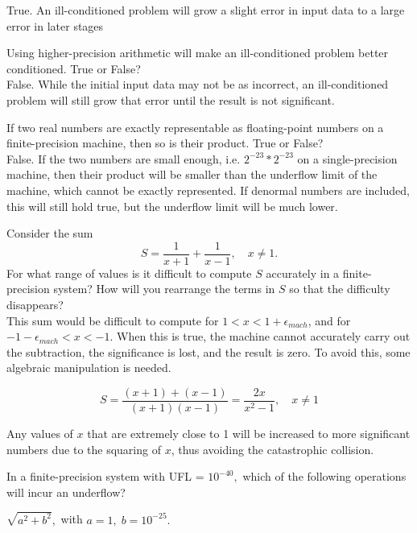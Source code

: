 	True. An ill-conditioned problem will grow a slight error in input data to a large error in later stages \\

\item Using higher-precision arithmetic will make an ill-conditioned problem better conditioned.  True or False? \\

	False. While the initial input data may not be as incorrect, an ill-conditioned problem will still grow that error until the result
	is not significant. \\

\item  If two real numbers are exactly representable as floating-point numbers on a finite-precision machine, then so is their product.  True or False? \\

	False. If the two numbers are small enough, i.e. $2^{-23} * 2^{-23}$ on a single-precision machine, then their product will be
	smaller than the underflow limit of the machine, which cannot be exactly represented. If denormal numbers are included, this will
	still hold true, but the underflow limit will be much lower.
\item  Consider the sum
\[
S = \frac{1}{x+1} + \frac{1}{x-1}, \quad x \ne 1.
\]
For what range of values is it difficult to compute $S$ accurately in a finite-precision system?  How will you rearrange the terms in $S$ so that the difficulty disappears? \\

This sum would be difficult to compute for $1 < x < 1+\epsilon_{mach}$, and for $-1-\epsilon_{mach} < x < -1$. When this is true,
the machine cannot accurately carry out the subtraction, the significance is lost, and the result is zero. To avoid this, some algebraic
manipulation is needed.

$$S = \frac{(x+1)+(x-1)}{(x+1)(x-1)} = \frac{2x}{x^2-1}, \quad x \ne 1$$

Any values of $x$ that are extremely close to 1 will be increased to more significant numbers due to the squaring of $x$, thus avoiding the
catastrophic collision. \\

\item In a finite-precision system with UFL = $10^{-40},$ which of the following operations will incur an underflow?
\benum
\item $\sqrt{a^2+b^2},$ with $a=1, \; b=10^{-25}.$\\

